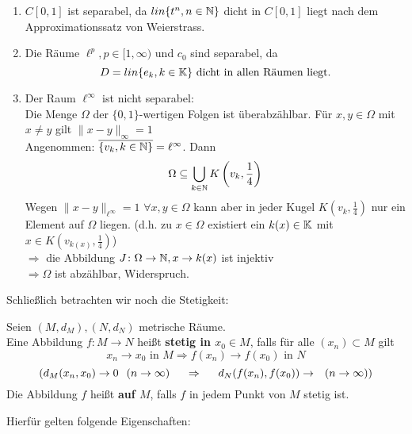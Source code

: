 \begin{beispiel}
\begin{enumerate}[label=\alph*\upshape)]
		\item $C[0, 1]$ ist separabel, da $ lin \{ t^{n}, n \in \mathbb{N} \} $ dicht in $C[0, 1]$ liegt nach dem Approximationssatz von Weierstrass.
		\item Die Räume $\ell^{p}, p \in [1, \infty)$ und $c_{0}$ sind separabel, da
			\[ D = lin \{ e_{k}, k \in \mathbb{K} \} \text{ dicht in allen Räumen liegt.} \]
		\item Der Raum $\ell^{\infty}$ ist nicht separabel: \\
			Die Menge $\Omega$ der $\{0, 1\}$-wertigen Folgen ist überabzählbar. Für $x, y \in \Omega$ mit $x \neq y$ gilt $\| x - y \|_{\infty} = 1$ \\
			Angenommen: $\overline{ \{v_{k}, k \in \mathbb{N} \} } = \ell^{\infty}$. Dann
			\[ \Omega \subseteq \bigcup_{k \in \mathbb{N}} K \left( v_{k}, \frac{1}{4} \right) \]
			Wegen $\| x - y\|_{\ell^{\infty}} = 1$ $\forall x, y \in \Omega$ kann aber in jeder Kugel $K(v_{k}, \frac{1}{4})$ nur ein Element auf $\Omega$ liegen. 
			(d.h. zu $x \in \Omega$ existiert ein $k(x) \in \mathbb{K}$ mit $x \in K(v_{k(x)}, \frac{1}{4})$) \\
			$\Rightarrow$ die Abbildung $ J \colon \Omega \rightarrow \mathbb{N}, x \rightarrow k(x)$ ist injektiv \\
			$\Rightarrow \Omega$ ist abzählbar, Widerspruch.
	\end{enumerate}
\end{beispiel}


Schlie{\ss}lich betrachten wir noch die Stetigkeit:


\begin{definition}
	Seien $(M, d_{M}), (N, d_{N})$ metrische Räume. \\
	Eine Abbildung $f \colon M \rightarrow N$ hei{\ss}t \textbf{stetig in $x_{0} \in M$}, falls für alle $(x_{n}) \subset M$ gilt
	\[ x_{n} \rightarrow x_{0} \text{ in } M \Rightarrow f(x_{n}) \rightarrow f(x_{0}) \text{ in } N \]
	\[ (d_{M}(x_{n}, x_{0}) \rightarrow 0 \hspace{0.25cm} (n \rightarrow \infty) \hspace{0.5cm} \Rightarrow \hspace{0.5cm} d_{N}(f(x_{n}), f(x_{0})) \rightarrow \hspace{0.25cm} (n \rightarrow \infty)) \]
	Die Abbildung $f$ hei{\ss}t  \textbf{auf $M$}, falls $f$ in jedem Punkt von $M$ stetig ist.
\end{definition}


Hierfür gelten folgende Eigenschaften:


